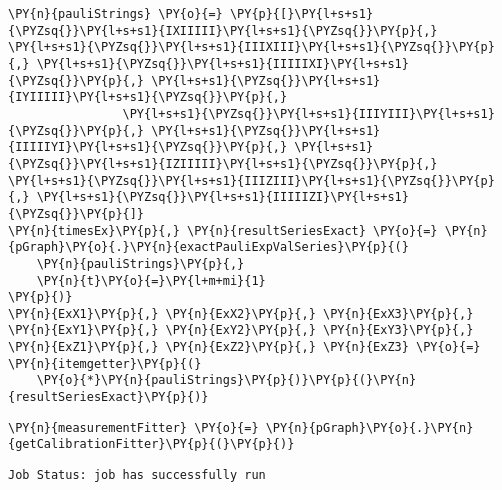     \begin{tcolorbox}[breakable, size=fbox, boxrule=1pt, pad at break*=1mm,colback=cellbackground, colframe=cellborder]
\begin{Verbatim}[commandchars=\\\{\}]
\PY{n}{pauliStrings} \PY{o}{=} \PY{p}{[}\PY{l+s+s1}{\PYZsq{}}\PY{l+s+s1}{IXIIIII}\PY{l+s+s1}{\PYZsq{}}\PY{p}{,} \PY{l+s+s1}{\PYZsq{}}\PY{l+s+s1}{IIIXIII}\PY{l+s+s1}{\PYZsq{}}\PY{p}{,} \PY{l+s+s1}{\PYZsq{}}\PY{l+s+s1}{IIIIIXI}\PY{l+s+s1}{\PYZsq{}}\PY{p}{,} \PY{l+s+s1}{\PYZsq{}}\PY{l+s+s1}{IYIIIII}\PY{l+s+s1}{\PYZsq{}}\PY{p}{,}
                \PY{l+s+s1}{\PYZsq{}}\PY{l+s+s1}{IIIYIII}\PY{l+s+s1}{\PYZsq{}}\PY{p}{,} \PY{l+s+s1}{\PYZsq{}}\PY{l+s+s1}{IIIIIYI}\PY{l+s+s1}{\PYZsq{}}\PY{p}{,} \PY{l+s+s1}{\PYZsq{}}\PY{l+s+s1}{IZIIIII}\PY{l+s+s1}{\PYZsq{}}\PY{p}{,} \PY{l+s+s1}{\PYZsq{}}\PY{l+s+s1}{IIIZIII}\PY{l+s+s1}{\PYZsq{}}\PY{p}{,} \PY{l+s+s1}{\PYZsq{}}\PY{l+s+s1}{IIIIIZI}\PY{l+s+s1}{\PYZsq{}}\PY{p}{]}
\PY{n}{timesEx}\PY{p}{,} \PY{n}{resultSeriesExact} \PY{o}{=} \PY{n}{pGraph}\PY{o}{.}\PY{n}{exactPauliExpValSeries}\PY{p}{(}
    \PY{n}{pauliStrings}\PY{p}{,}
    \PY{n}{t}\PY{o}{=}\PY{l+m+mi}{1}
\PY{p}{)}
\PY{n}{ExX1}\PY{p}{,} \PY{n}{ExX2}\PY{p}{,} \PY{n}{ExX3}\PY{p}{,} \PY{n}{ExY1}\PY{p}{,} \PY{n}{ExY2}\PY{p}{,} \PY{n}{ExY3}\PY{p}{,} \PY{n}{ExZ1}\PY{p}{,} \PY{n}{ExZ2}\PY{p}{,} \PY{n}{ExZ3} \PY{o}{=} \PY{n}{itemgetter}\PY{p}{(}
    \PY{o}{*}\PY{n}{pauliStrings}\PY{p}{)}\PY{p}{(}\PY{n}{resultSeriesExact}\PY{p}{)}
\end{Verbatim}
\end{tcolorbox}

    \begin{tcolorbox}[breakable, size=fbox, boxrule=1pt, pad at break*=1mm,colback=cellbackground, colframe=cellborder]
\begin{Verbatim}[commandchars=\\\{\}]
\PY{n}{measurementFitter} \PY{o}{=} \PY{n}{pGraph}\PY{o}{.}\PY{n}{getCalibrationFitter}\PY{p}{(}\PY{p}{)}
\end{Verbatim}
\end{tcolorbox}

    \begin{Verbatim}[commandchars=\\\{\}]
Job Status: job has successfully run
    \end{Verbatim}

